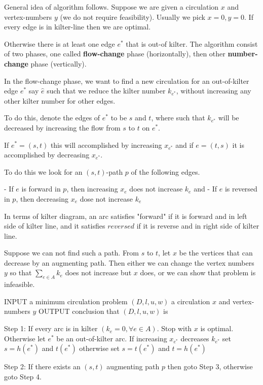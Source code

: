 			General idea of algorithm follows. Suppose we are given a circulation $x$ and vertex-numbers $y$ (we do not require feasibility). Usually we pick $x=0, y=0$. If every edge is in kilter-line then we are optimal.

			Otherwise there is at least one edge $e^*$ that is out-of kilter. The algorithm consist of two phases, one called \textbf{flow-change} phase (horizontally), then other \textbf{number-change} phase (vertically).

			In the flow-change phase, we want to find a new circulation for an out-of-kilter edge $e^*$ say $\hat{e}$ such that we reduce the kilter number $k_{e^*}$, without increasing any other kilter number for other edges.

			To do this, denote the edges of $e^*$ to be $s$ and $t$, where such that $k_{e^*}$ will be decreased by increasing the flow from $s$ to $t$ on $e^*$.

			If $e^*=(s, t)$ this will accomplished by increasing $x_{e^*}$ and if $e=(t, s)$  it is accomplished by decreasing $x_{e^*}$. 

			To do this we look for an $(s, t)$-path $p$ of the following edges.

			- If $e$ is forward in $p$, then increasing $x_e$ does not increase $k_e$ and
			- If $e$ is reversed in $p$, then decreasing $x_e$ dose not increase $k_e$

			In terms of kilter diagram, an arc satisfies "forward" if it is forward and in left side of kilter line, and it satisfies $reversed$ if it is reverse and in right side of kilter line.

			Suppose we can not find such a path. From $s$ to $t$, let $x$ be the vertices that can decrease by an augmenting path. Then either we can change the vertex numbers $y$ so that $\sum_{e\in A} k_e$ does not increase but $x$ does, or we can show that problem is infeasible.

			INPUT a minimum circulation problem $(D, l, u, w)$ a circulation $x$ and vertex-numbers $y$
			OUTPUT conclusion that $(D, l, u, w)$ is 

			Step 1: If every arc is in kilter $(k_e = 0, \forall e\in A)$. Stop with $x$ is optimal. Otherwise let $e^*$ be an out-of-kilter arc. If increasing $x_{e^*}$ decreases $k_{e^*}$ set $s=h(e^*)$ and $t(e^*)$ otherwise set $s=t(e^*)$ and $t=h(e^*)$

			Step 2: If there exists an $(s, t)$ augmenting path $p$ then goto Step 3, otherwise goto Step 4.


